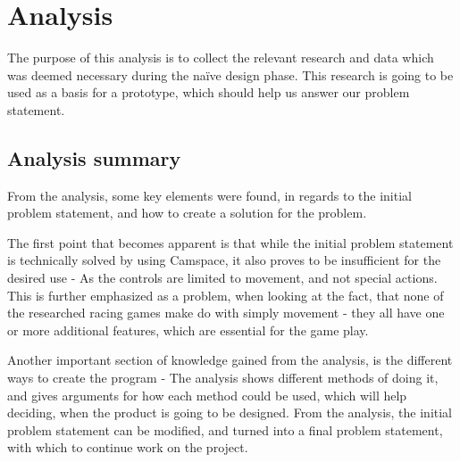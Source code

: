 \section{Analysis} \label{sec:analysis}
The purpose of this analysis is to collect the relevant research and data which was deemed necessary during the naïve design phase. This research is going to be used as a basis for a prototype, which should help us answer our problem statement. 










\subsection{Analysis summary}
From the analysis, some key elements were found, in regards to the initial problem statement, and how to create a solution for the problem.

The first point that becomes apparent is that while the initial problem statement is technically solved by using Camspace, it also proves to be insufficient for the desired use - As the controls are limited to movement, and not special actions. This is further emphasized as a problem, when looking at the fact, that none of the researched racing games make do with simply movement - they all have one or more additional features, which are essential for the game play.

Another important section of knowledge gained from the analysis, is the different ways to create the program - The analysis shows different methods of doing it, and gives arguments for how each method could be used, which will help deciding, when the product is going to be designed.
From the analysis, the initial problem statement can be modified, and turned into a final problem statement, with which to continue work on the project.
